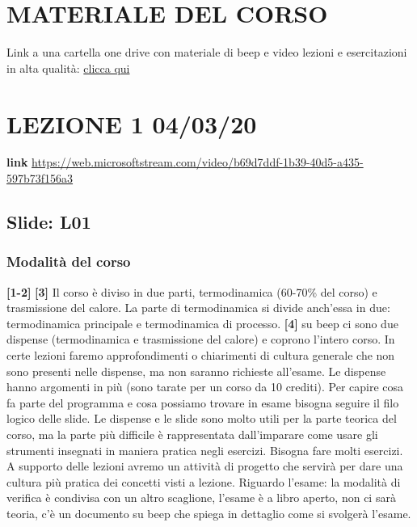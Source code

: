 \section*{MATERIALE DEL CORSO}
Link a una cartella one drive con materiale di beep e video lezioni e esercitazioni in alta qualità:
\href{https://polimi365-my.sharepoint.com/personal/10304796_polimi_it/_layouts/15/onedrive.aspx?id=%2Fpersonal%2F10304796%5Fpolimi%5Fit%2FDocuments%2FFisicaTecnica2019%2D2020%5FINF&ct=1585366140917&or=OWA-NTB&cid=7ae5a48e-6f76-321c-d57b-c21d3b4d10f6&originalPath=aHR0cHM6Ly9wb2xpbWkzNjUtbXkuc2hhcmVwb2ludC5jb20vOmY6L2cvcGVyc29uYWwvMTAzMDQ3OTZfcG9saW1pX2l0L0VtS2lKTFJsS0RSUGxkSTJDVXlfMWg0QjFDSFhsM2p5MENHWEt5MzNrQXc0cnc_cnRpbWU9Q2wtaUxjalMxMGc}{clicca qui}
\section*{LEZIONE 1 04/03/20}
\textbf{link} \url{https://web.microsoftstream.com/video/b69d7ddf-1b39-40d5-a435-597b73f156a3}
\subsection*{Slide: L01}
\subsubsection*{Modalità del corso}
\textbf{[1-2]}\;\newline
\textbf{[3]}\; Il corso è diviso in due parti, termodinamica (60-70\% del corso) e trasmissione del calore. La parte di termodinamica si divide anch'essa in due: termodinamica principale e termodinamica di processo.\newline
\textbf{[4]}\; su beep ci sono due dispense (termodinamica e trasmissione del calore) e coprono l'intero corso. In certe lezioni faremo approfondimenti o chiarimenti di cultura generale che non sono presenti nelle dispense, ma non saranno richieste all'esame. Le dispense hanno argomenti in più (sono tarate per un corso da 10 crediti). Per capire cosa fa parte del programma e cosa possiamo trovare in esame bisogna seguire il filo logico delle slide. Le dispense e le slide sono molto utili per la parte teorica del corso, ma la parte più difficile è rappresentata dall'imparare come usare gli strumenti insegnati in maniera pratica negli esercizi. Bisogna fare molti esercizi. A supporto delle lezioni avremo un attività di progetto che servirà per dare una cultura più pratica dei concetti visti a lezione.\newline
Riguardo l'esame: la modalità di verifica è condivisa con un altro scaglione, l'esame è a libro aperto, non ci sarà teoria, c'è un documento su beep che spiega in dettaglio come si svolgerà l'esame.
